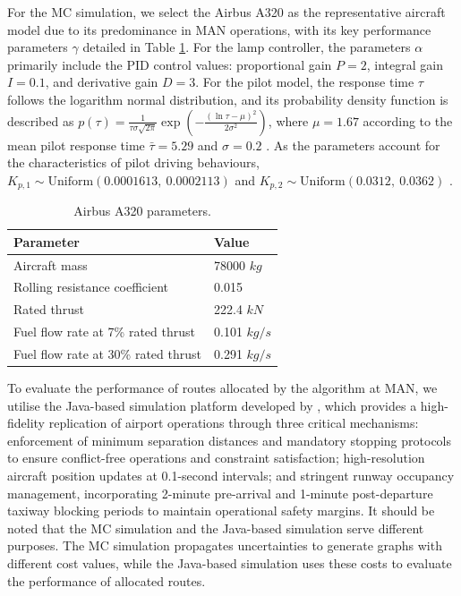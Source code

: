 \documentclass{article}
\begin{document}
For the MC simulation, we select the Airbus A320 as the representative aircraft model due to its predominance in MAN operations, with its key performance parameters $\gamma$ detailed in Table \ref{a320 parameters}. For the lamp controller, the parameters $\alpha$ primarily include the PID control values: proportional gain $P = 2$, integral gain $I = 0.1$, and derivative gain $D = 3$. For the pilot model, the response time $\tau$ follows the logarithm normal distribution, and its probability density function is described as $p(\tau) = \frac{1}{\tau \sigma \sqrt{2\pi}} \exp\left( -\frac{(\ln \tau - \mu)^2}{2\sigma^2} \right)$, where $\mu=1.67$ according to the mean pilot response time $\bar{\tau}=5.29$ and $\sigma=0.2$  \cite{zhang2020feasibility}. As the parameters account for the characteristics of pilot driving behaviours, $K_{p,1} \sim \text{Uniform}(0.0001613,\ 0.0002113)$ and $K_{p,2} \sim \text{Uniform}(0.0312,\ 0.0362)$ \cite{zhang2020feasibility}.

\begin{table}[ht]
    \centering
    \caption{Airbus A320 parameters.}
    \begin{tabular}{ll}
        \toprule
        \textbf{Parameter} & \textbf{Value} \\
        \midrule
        Aircraft mass & 78000 $kg$ \\
        Rolling resistance coefficient & 0.015 \\
        Rated thrust & 222.4 $kN$ \\
        Fuel flow rate at 7\% rated thrust & 0.101 $kg/s$ \\
        Fuel flow rate at 30\% rated thrust & 0.291 $kg/s$ \\
        \bottomrule
    \end{tabular}
    \label{a320 parameters}
\end{table}

To evaluate the performance of routes allocated by the algorithm at MAN, we utilise the Java-based simulation platform developed by \cite{brownlee2018fuzzy}, which provides a high-fidelity replication of airport operations through three critical mechanisms: enforcement of minimum separation distances and mandatory stopping protocols to ensure conflict-free operations and constraint satisfaction; high-resolution aircraft position updates at 0.1-second intervals; and stringent runway occupancy management, incorporating 2-minute pre-arrival and 1-minute post-departure taxiway blocking periods to maintain operational safety margins. It should be noted that the MC simulation and the Java-based simulation serve different purposes. The MC simulation propagates uncertainties to generate graphs with different cost values, while the Java-based simulation uses these costs to evaluate the performance of allocated routes.
\end{document}
